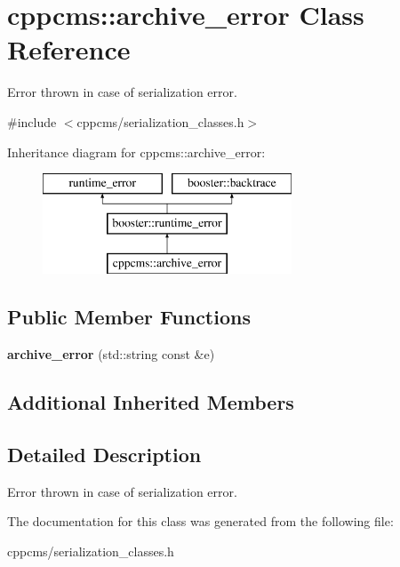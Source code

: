 \section{cppcms\-:\-:archive\-\_\-error Class Reference}
\label{classcppcms_1_1archive__error}


Error thrown in case of serialization error.  




{\ttfamily \#include $<$cppcms/serialization\-\_\-classes.\-h$>$}

Inheritance diagram for cppcms\-:\-:archive\-\_\-error\-:\begin{figure}[H]
\begin{center}
\leavevmode
\includegraphics[height=3.000000cm]{classcppcms_1_1archive__error}
\end{center}
\end{figure}
\subsection*{Public Member Functions}
\begin{DoxyCompactItemize}
\item 
{\bfseries archive\-\_\-error} (std\-::string const \&e)\label{classcppcms_1_1archive__error_abe2df913b4c009ffb5fce90f0b81702e}

\end{DoxyCompactItemize}
\subsection*{Additional Inherited Members}


\subsection{Detailed Description}
Error thrown in case of serialization error. 

The documentation for this class was generated from the following file\-:\begin{DoxyCompactItemize}
\item 
cppcms/serialization\-\_\-classes.\-h\end{DoxyCompactItemize}
